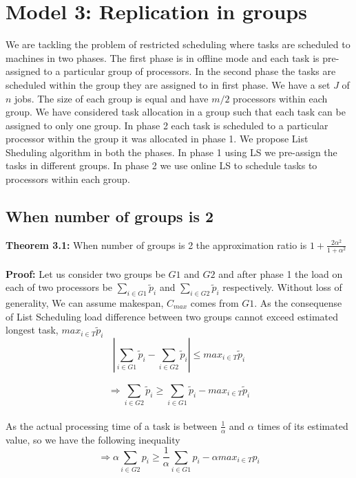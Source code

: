\documentclass[10pt, conference, compsocconf]{IEEEtran}
\begin{document}
\section{Model 3: Replication in groups}
We are tackling the  problem of restricted scheduling where tasks are scheduled to machines in two phases. The first phase is in offline mode and each task is pre-assigned to a particular  group of processors. In the second phase the tasks are scheduled  within the group they are assigned to in first phase.   We have a set $J$ of $ n$ jobs.  The size of each group is equal and have $m/2$ processors within each group.  We have considered task allocation in a group such that each task can be assigned to only one group.  In phase 2  each task is scheduled to a particular processor within the group it was allocated in phase 1.  We propose  List Sheduling algorithm in both the phases. In phase 1 using LS we pre-assign the tasks in different groups.  In phase 2 we use online LS to schedule tasks to processors within each group.

\subsection{When number of groups is 2}

\textbf{Theorem 3.1:} When number of groups is 2 the approximation ratio is $1 + \frac{2\alpha^{2}}{1+\alpha^{2}} $ \\
\\
\textbf{Proof:} 
 Let us consider two groups be $G1$ and $G2$ and after phase 1 the load on  each of two processors be $\sum_{i \in G1 }^{}{\tilde p_{i}}$ and $\sum_{i \in G2 }^{}{\tilde p_{i}}$ respectively. Without loss of generality, We can assume makespan, $C_{max}$ comes from $G1$.  As the consequense of List Scheduling load difference between two groups cannot exceed estimated longest task, ${max_{i \in T}}{\tilde p_{i}}$\\
\begin{equation}\nonumber
|\sum_{i \in G1 }^{}{\tilde p_{i}}- \sum_{i \in G2 }^{}{\tilde p_{i}}| \leq {max_{i \in T}}{\tilde p_{i}}\end{equation}

\begin{equation}\nonumber 
\Rightarrow \sum_{i \in G2 }^{}{\tilde p_{i}} \geq \sum_{i \in G1 }^{}{\tilde p_{i}} - {max_{i \in T}}{\tilde p_{i}}\end{equation}
\\
As the actual processing time of a task is between $\frac{1}{\alpha}$ and $\alpha$ times of its estimated value, so we have the following inequality\\
\begin{equation}\nonumber 
\Rightarrow \alpha\sum_{i \in G2 }^{}{{p_{i}}} \geq  {\frac{1}{\alpha}} \sum_{i \in G1 }^{}{{p_{i}}} - \alpha {max_{i \in T}}{{p_{i}}}
\end{equation}
\end{document}
